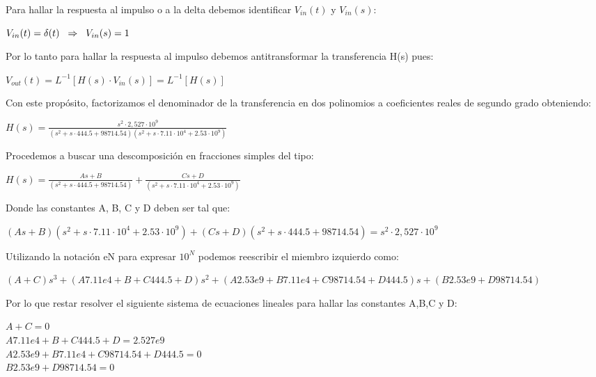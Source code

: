 \documentclass[12pt, titlepage]{article}
\begin{document}
    Para hallar la respuesta al impulso o a la delta debemos identificar $V_{in}(t)$ y $V_{in}(s)$:
    \begin{center}
        $V_{in}(t) = \delta(t) \hspace{2mm} \Rightarrow  \hspace{2mm} V_{in}(s) = 1$
    \end{center}
    
    Por lo tanto para hallar la respuesta al impulso debemos antitransformar la transferencia H(s) pues:
    \begin{center}
        $V_{out}(t) = L^{-1}[H(s) \cdot V_{in}(s)] = L^{-1}[H(s)]$
    \end{center}
  
    Con este propósito, factorizamos el denominador de la transferencia en dos polinomios a coeficientes reales de segundo grado obteniendo:
    
    \begin{center}
        $H(s) = \frac{s^2 \cdot 2,527 \cdot 10^9}{(s^2+ s \cdot 444.5 + 98714.54)(s^2 +s \cdot 7.11\cdot 10^{4} + 2.53\cdot10^{9})} $
    \end{center}
    
    Procedemos a buscar una descomposición en fracciones simples del tipo:
    
    \begin{center}
          $H(s) = \frac{A s + B}{(s^2+ s \cdot 444.5 + 98714.54)} +  \frac{Cs + D}{(s^2 +s \cdot 7.11\cdot 10^{4} + 2.53\cdot10^{9})}$
    \end{center}
    
    Donde las constantes A, B, C y D deben ser tal que:
    
    \begin{center}
        $(As+B)(s^2 +s \cdot 7.11\cdot 10^{4} + 2.53\cdot10^{9})+(Cs+D)(s^2+ s \cdot 444.5 + 98714.54) = s^2 \cdot 2,527 \cdot 10^9$
    \end{center}
    
    Utilizando la notación eN para expresar $10^N$ podemos reescribir el miembro izquierdo como:
    
    \begin{center}
        \footnotesize$(A+C)s^3+(A7.11e4 +B+C444.5+D)s^2+(A2.53e9 + B7.11e4+ C98714.54 +D444.5)s+ (B2.53e9 + D98714.54)$
    \end{center}
    
    Por lo que restar resolver el siguiente sistema de ecuaciones lineales para hallar las constantes A,B,C y D:
    \begin{center}
    $A+C = 0$\\
    $A7.11e4 +B+C444.5+D = 2.527e9$\\
    $A2.53e9 + B7.11e4+ C98714.54 +D444.5 = 0$\\
    $B2.53e9 + D98714.54 = 0$
    \end{center}
    
\end{document}
